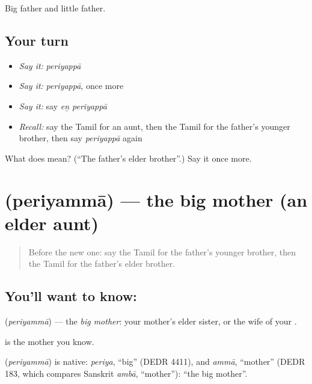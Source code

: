 \begin{grammarlens}[title={What you've built}]
Big father and little father.
\end{grammarlens}

\subsection*{Your turn}
\begin{itemize}
\raggedright
  \item \emph{Say it:} \emph{periyappā}
  \item \emph{Say it:} \emph{periyappā}, once more
  \item \emph{Say it:} say \emph{eṉ periyappā}
  \item \emph{Recall:} say the Tamil for an aunt, then the Tamil for the father's younger brother, then say \emph{periyappā} again
\end{itemize}

\begin{tcolorbox}[breakable,colback=teal!4,colframe=teal!35!black,title={Before you move on}]
What does  mean? (\textquotedblleft{}The father's elder brother\textquotedblright{}.) Say it once more.
\end{tcolorbox}
\section[\texorpdfstring{\ta{பெரியம்மா} (periyammā)}{பெரியம்மா (periyammā)}]{ (periyammā) — the big mother (an elder aunt)}

\label{lesson:TA-C102-periyamma}



\begin{quote}
Before the new one: say the Tamil for the father's younger brother, then the Tamil for the father's elder brother.
\end{quote}

\subsection*{You'll want to know: }
\textbf{} (\emph{periyammā}) — the \emph{big mother}: your mother's elder sister, or the wife of your \textbf{}.

\textbf{} is the mother you know.

\begin{cousinweb}
\textbf{} (\emph{periyammā}) is native: \emph{periya}, \textquotedblleft{}big\textquotedblright{} (DEDR 4411), and \emph{ammā}, \textquotedblleft{}mother\textquotedblright{} (DEDR 183, which compares Sanskrit \emph{ambā}, \textquotedblleft{}mother\textquotedblright{}): \textquotedblleft{}the big mother\textquotedblright{}.
\end{cousinweb}

